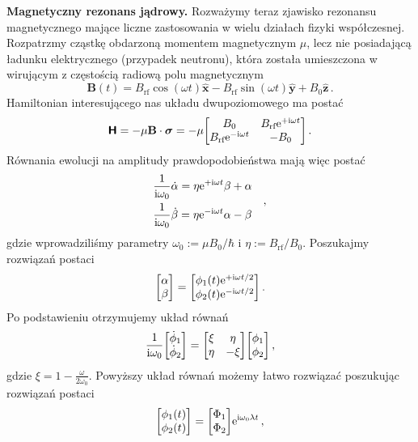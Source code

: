 \documentclass{myclass}
\begin{document}
\textbf{Magnetyczny rezonans jądrowy.} Rozważymy teraz zjawisko rezonansu magnetycznego mające
liczne zastosowania w wielu działach fizyki współczesnej. Rozpatrzmy cząstkę obdarzoną momentem
magnetycznym \(\mu\), lecz nie posiadającą ładunku elektrycznego (przypadek neutronu), która została
umieszczona w wirującym z częstością radiową polu magnetycznym
\begin{equation*}
    \mathbf{B}(t) = B_\text{rf}\cos(\omega t)\mathbf{\hat{x}} - B_\text{rf}\sin(\omega t) \mathbf{\hat{y}} + B_0\mathbf{\hat{z}}\,.
\end{equation*}
Hamiltonian interesującego nas układu dwupoziomowego ma postać
\begin{equation*}
    \oper{H} = -\mu\mathbf{B}\cdot\boldsymbol{\sigma} = -\mu\mqty[B_0 & B_\text{rf}\e^{+\im\omega t} \\ B_\text{rf}\e^{-\im\omega t} & -B_0]\,.
\end{equation*}
Równania ewolucji na amplitudy prawdopodobieństwa mają więc postać
\begin{equation*}
    \begin{split}
        &\frac{1}{\mathrm{i}\omega_0}\dot{\alpha} =\eta\mathrm{e}^{+\mathrm{i}\omega t}\beta + \alpha \\
        &\frac{1}{\mathrm{i}\omega_0}\dot{\beta} = \eta\mathrm{e}^{-\mathrm{i}\omega t}\alpha - \beta
    \end{split}\quad,
\end{equation*}
gdzie wprowadziliśmy parametry \(\omega_0 := \mu B_0 / \hbar\) i \(\eta := B_\text{rf}/B_0\).
Poszukajmy rozwiązań postaci
\begin{equation*}
    \mqty[\alpha\\\beta] = \mqty[\phi_1(t)\e^{+\im\omega t/2} \\ \phi_2(t)\e^{-\im\omega t/2}]\,.
\end{equation*}
Po podstawieniu otrzymujemy układ równań
\begin{equation*}
    \frac{1}{\im\omega_0}\mqty[\dot{\phi}_1 \\ \dot{\phi}_2] = \mqty[\xi & \eta \\ \eta & -\xi]\mqty[\phi_1 \\ \phi_2]\,,
\end{equation*}
gdzie \(\xi = 1 - \frac{\omega}{2\omega_0}\). Powyższy układ równań możemy łatwo rozwiązać
poszukując rozwiązań postaci
\begin{equation*}
    \mqty[\phi_1(t) \\ \phi_2(t)] = \mqty[\Phi_1 \\ \Phi_2] \e^{\im\omega_0\lambda t}\,,
\end{equation*}
\end{document}

